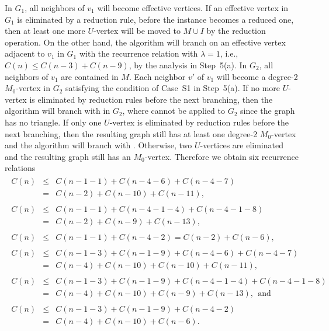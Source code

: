 \documentclass{elsart_TR2}
\begin{document}
In $G_1$, all neighbors of $v_1$ will become effective vertices.
If an effective vertex in $G_1$ is  eliminated by a reduction rule, before the instance becomes a reduced one,
 then at least one more $U$-vertex will be moved to $M\cup I$ by the reduction operation.
On the other hand, the algorithm will branch on an effective vertex adjacent to $v_1$ in $G_1$
with the recurrence relation
   with $\lambda=1$, i.e., $C(n)\leq C(n-3)+C(n-9)$, by the analysis in Step~5(a).
In $G_2$,  all neighbors of $v_1$ are contained in $M$.
Each neighbor $v'$ of $v_1$ will become a degree-2 $M_0$-vertex in $G_2$ satisfying the condition of
Case~S1 in Step~5(a).
If no  more $U$-vertex is eliminated by reduction rules before the next branching,
then the algorithm will branch
with  in $G_2$, where  
cannot be applied to $G_2$ since the graph has no triangle.
If only one $U$-vertex is eliminated by reduction rules before
the next branching, then the resulting graph still has at least one degree-2 $M_0$-vertex and the
algorithm will branch with .
Otherwise, two $U$-vertices are eliminated and the resulting graph still has an $M_0$-vertex.
Therefore we obtain six recurrence relations
\begin{eqnarray*}
\begin{array}{rcl}
C(n) &\leq & C(n-1-1)+C(n-4-6)+C(n-4-7)\\
&= & C(n-2)+C(n-10)+C(n-11),\\
& & \\
C(n)&\leq &C(n-1-1)+C(n-4-1-4)+C(n-4-1-8)\\
&=& C(n-2)+C(n-9)+C(n-13), \\
& & \\
C(n)&\leq &C(n-1-1)+C(n-4-2)=C(n-2)+C(n-6),\\
& & \\
C(n)&\leq &C(n-1-3)+C(n-1-9)+C(n-4-6)+C(n-4-7)\\
&=& C(n-4)+C(n-10)+C(n-10)+C(n-11),\\
& & \\
C(n)&\leq &C(n-1-3)+C(n-1-9)+C(n-4-1-4)+C(n-4-1-8)\\
&=& C(n-4)+C(n-10)+C(n-9)+C(n-13), ~~\mbox{and} \\
& & \\
C(n)&\leq &C(n-1-3)+C(n-1-9)+C(n-4-2)\\
&=& C(n-4)+C(n-10)+C(n-6).
\end{array}
\end{eqnarray*}
\end{document}

